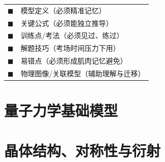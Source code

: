 \vspace{4pt}

\begin{cheatbox}[颜色速查]
\begin{tabular}{ll}
\textcolor{modelteal}{$\blacksquare$} & 模型定义（必须精准记忆） \\
\textcolor{successgreen}{$\blacksquare$} & 关键公式（必须能独立推导） \\
\textcolor{drillblue}{$\blacksquare$} & 训练点/考法（必须见过、练过） \\
\textcolor{alertred}{$\blacksquare$} & 解题技巧（考场时间压力下用） \\
\textcolor{errorred}{$\blacksquare$} & 易错点（必须形成肌肉记忆避免） \\
\textcolor{royalpurple}{$\blacksquare$} & 物理图像/关联模型（辅助理解与迁移） \\
\end{tabular}
\end{cheatbox}

\newpage

\tableofcontents
\newpage

\part{量子力学基础模型}\label{part:qm-models}\setpartcolor{\value{part}}


\newpage

\newpage

\newpage

\newpage

\newpage

\newpage

\newpage

\newpage

\newpage

\newpage

\newpage


\part{晶体结构、对称性与衍射}\label{part:crystal-structure}\setpartcolor{\value{part}}

\newpage

\newpage


